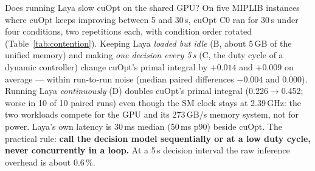 Does running Laya slow cuOpt on the shared GPU? On five MIPLIB
instances where cuOpt keeps improving between 5 and 30\,s, cuOpt C0 ran for 30\,s under four conditions, two
repetitions each, with condition order rotated (Table~\ref{tab:contention}). Keeping Laya \emph{loaded but idle}
(B, about 5\,GB of the unified memory) and making \emph{one decision every 5\,s} (C, the duty cycle of a dynamic
controller) change cuOpt's primal integral by $+0.014$ and $+0.009$ on average --- within run-to-run noise (median
paired differences $-0.004$ and $0.000$). Running Laya \emph{continuously} (D) doubles cuOpt's primal integral
(0.226$\to$0.452; worse in 10 of 10 paired runs) even though the SM clock stays at 2.39\,GHz: the two workloads
compete for the GPU and its 273\,GB/s memory system, not for power. Laya's own latency is 30\,ms median (50\,ms
p90) beside cuOpt. The practical rule: \textbf{call the decision model sequentially
or at a low duty cycle, never concurrently in a loop.} At a 5\,s decision interval the raw inference overhead is
about 0.6\,\%.
